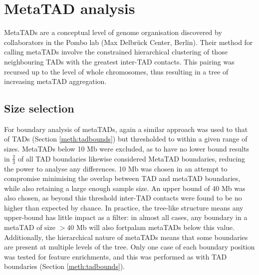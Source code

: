 \documentclass[a4paper,11pt,oneside]{book}
\begin{document}
\section{MetaTAD analysis}\label{meth:meta}

MetaTADs are a conceptual level of genome organisation discovered by collaborators in the Pombo lab (Max Delbr\"{u}ck Center, Berlin). Their method for calling metaTADs involve the constrained hierarchical clustering of those neighbouring TADs with the greatest inter-TAD contacts. This pairing was recursed up to the level of whole chromosomes, thus resulting in a tree of increasing metaTAD aggregation. 



\subsection{Size selection}\label{sec:metatad}

For boundary analysis of metaTADs, again a similar approach was used to that of TADs (Section \ref{meth:tadbounds}) but thresholded to within a given range of sizes. MetaTADs below 10 Mb were excluded, as to have no lower bound results in $\frac{2}{3}$ of all TAD boundaries likewise considered MetaTAD boundaries, reducing the power to analyse any differences. 10 Mb was chosen in an attempt to compromise minimising the overlap between TAD and metaTAD boundaries, while also retaining a large enough sample size. An upper bound of 40 Mb was also chosen, as beyond this threshold inter-TAD contacts were found to be no higher than expected by chance. In practice, the tree-like structure means any upper-bound has little impact as a filter: in almost all cases, any boundary in a metaTAD of size $> 40$ Mb will also fortpalam metaTADs below this value. Additionally, the hierarchical nature of metaTADs means that some boundaries are present at multiple levels of the tree. Only one case of each boundary position was tested for feature enrichments, and this was performed as with TAD boundaries (Section \ref{meth:tadbounds}).
\end{document}
